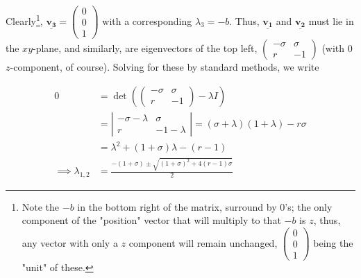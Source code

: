 \documentclass[12pt, oneside]{article}
\begin{document}
Clearly\footnote{Note the $-b$ in the bottom right of the matrix, surround by 0's; the only component of the "position" vector that will multiply to that $-b$ is $z$, thus, any vector with only a $z$ component will remain unchanged, $\begin{pmatrix}0\\0\\1\end{pmatrix}$ being the "unit" of these.}, $\underline{\mathbf{v_3}} = \begin{pmatrix}
  0\\
  0\\
  1
\end{pmatrix}$ with a corresponding $\lambda_3 = -b$. Thus, $\underline{\mathbf{v_1}}$ and $\underline{\mathbf{v_2}}$ must lie in the $xy$-plane, and similarly, are eigenvectors of the top left, $\begin{pmatrix}
  -\sigma & \sigma\\
  r & -1\end{pmatrix}$ (with 0 $z$-component, of course). Solving for these by standard methods, we write
  
\begin{align*}
  0 &= \det\left(\begin{pmatrix} 
    - \sigma & \sigma \\
    r & -1
  \end{pmatrix} - \lambda I\right)\\
  &= \left|\begin{matrix}
    -\sigma - \lambda & \sigma\\
    r & -1 - \lambda
  \end{matrix}\right| = (\sigma+\lambda)(1+\lambda) - r\sigma\\
  &= \lambda^2 + (1+\sigma)\lambda- (r-1)\\
  \implies \lambda_{1,2} &= \frac{-(1+\sigma) \pm \sqrt{(1+\sigma)^2 + 4(r-1)\sigma}}{2}
\end{align*}
\end{document}
